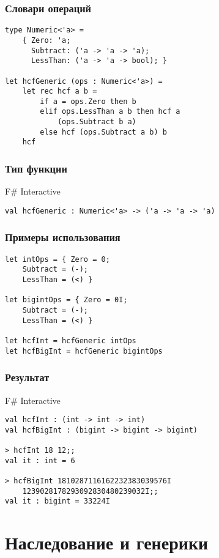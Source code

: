 \documentclass[xetex,mathserif,serif]{beamer}
\begin{document}
	\begin{frame}[fragile]
		\frametitle{Словари операций}
		\begin{verbatim}
type Numeric<'a> =
    { Zero: 'a;
      Subtract: ('a -> 'a -> 'a);
      LessThan: ('a -> 'a -> bool); }

let hcfGeneric (ops : Numeric<'a>) =
    let rec hcf a b =
        if a = ops.Zero then b
        elif ops.LessThan a b then hcf a 
            (ops.Subtract b a)
        else hcf (ops.Subtract a b) b
    hcf
		\end{verbatim}
	\end{frame}

	\begin{frame}[fragile]
		\frametitle{Тип функции}
		\begin{alertblock}{F\# Interactive}
			\begin{verbatim}
val hcfGeneric : Numeric<'a> -> ('a -> 'a -> 'a)
			\end{verbatim}
		\end{alertblock}
	\end{frame}

	\begin{frame}[fragile]
		\frametitle{Примеры использования}
		\begin{verbatim}
let intOps = { Zero = 0; 
    Subtract = (-); 
    LessThan = (<) }
    
let bigintOps = { Zero = 0I; 
    Subtract = (-); 
    LessThan = (<) }

let hcfInt = hcfGeneric intOps
let hcfBigInt = hcfGeneric bigintOps
		\end{verbatim}
	\end{frame}

	\begin{frame}[fragile]
		\frametitle{Результат}
		\begin{alertblock}{F\# Interactive}
			\begin{verbatim}
val hcfInt : (int -> int -> int)
val hcfBigInt : (bigint -> bigint -> bigint)

> hcfInt 18 12;;
val it : int = 6

> hcfBigInt 1810287116162232383039576I 
    1239028178293092830480239032I;;
val it : bigint = 33224I
			\end{verbatim}
		\end{alertblock}
	\end{frame}

	\section{Наследование и генерики}
	
\end{document}
